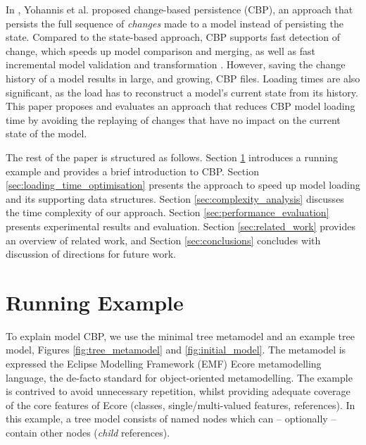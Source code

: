 \documentclass{llncs}
\begin{document}
    In \cite{yohannis2017turning}, Yohannis et al. proposed change-based persistence (CBP), an approach that persists the full sequence of \emph{changes} made to a model instead of persisting the state.  Compared to the state-based approach, CBP supports fast detection of change, which speeds up model comparison and merging, as well as fast incremental model validation and transformation \cite{rath2012derived,ogunyomi2015property}.
    However, saving the change history of a model results in large, and growing, CBP files.  Loading times are also significant, as the load has to reconstruct a model's current state from its history\cite{yohannis2017turning}.   This paper proposes and evaluates an approach that reduces CBP model loading time by avoiding the replaying of changes that have no impact on the current state of the model.
    
    The rest of the paper is structured as follows. Section \ref{sec:case_study} introduces a running example and provides a brief introduction to CBP.
    Section \ref{sec:loading_time_optimisation} presents the approach to speed up model loading and its supporting data structures. Section \ref{sec:complexity_analysis} discusses the time complexity of our approach. Section \ref{sec:performance_evaluation} presents experimental results and evaluation. Section \ref{sec:related_work} provides an overview of related work, and Section \ref{sec:conclusions} concludes with discussion of directions for future work.
    
    \section{Running Example}
    \label{sec:case_study}
    To explain model CBP, we use the minimal tree metamodel and an example tree model, Figures \ref{fig:tree_metamodel} and \ref{fig:initial_model}.
    The metamodel is expressed the Eclipse Modelling Framework (EMF) Ecore metamodelling language, the de-facto standard for object-oriented metamodelling.  The example is contrived to avoid unnecessary repetition, whilst providing adequate coverage of the core features of Ecore (classes, single/multi-valued features, references).
    In this example, a tree model consists of named nodes which can -- optionally -- contain other nodes (\emph{child} references).
    
\end{document}

